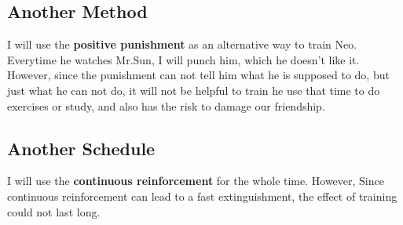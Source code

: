 \documentclass{article}
\begin{document}
	\subsection{Another Method}
	I will use the \textbf{positive punishment} as an alternative way to train Neo.
	Everytime he watches Mr.Sun, I will punch him, which he doesn't like it.
	However, since the punishment can not tell him what he is supposed to do, but
	just what he can not do, it will not be helpful to train he use that time to do
	exercises or study, and also has the risk to damage our friendship.
	
	\subsection{Another Schedule}
	I will use the \textbf{continuous reinforcement} for the whole time. However,
	Since continuous reinforcement can lead to a fast extinguishment, the effect of
	training could not last long.
\end{document}
